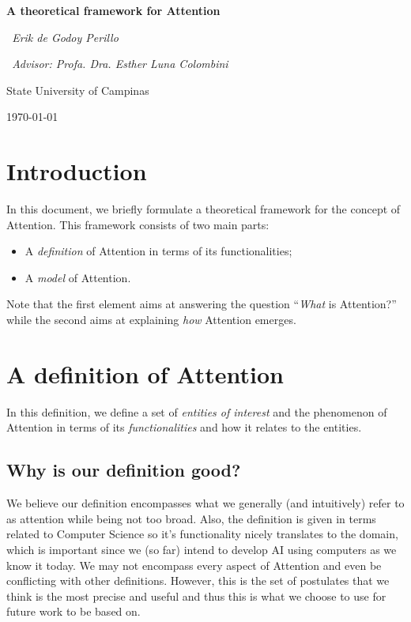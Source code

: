 \documentclass[11pt]{article}
\begin{document}

\begin{titlepage}
	\centering
	{\scshape\Large \par}
	\vspace{3.5cm}
	{\huge\bfseries A theoretical framework for Attention\par}
	\vspace{1cm}
	{\itshape~Erik de Godoy Perillo\par}%
    {\itshape~Advisor: Profa. Dra. Esther Luna Colombini\par}%
	\vspace{0.5cm}
	\vfill
	State University of Campinas
	\vfill
	{\large \today\par}
\end{titlepage}

\newpage




\section{Introduction}
In this document, we briefly formulate a theoretical framework for the concept of Attention.
This framework consists of two main parts:
\begin{itemize}
    \item A \emph{definition} of Attention in terms of its functionalities;
    \item A \emph{model} of Attention.
\end{itemize}
Note that the first element aims at answering the question ``\emph{What} is Attention?''
while the second aims at explaining \emph{how} Attention emerges.

\section{A definition of Attention}
\label{sec:definition}
In this definition, we define a set of \emph{entities of interest} and the phenomenon of Attention in terms of
its \emph{functionalities} and how it relates to the entities.

\subsection{Why is our definition good?}
We believe our definition encompasses what we generally (and intuitively) refer to as attention while being not too broad.
Also, the definition is given in terms related to Computer Science so it’s functionality nicely translates to the domain,
which is important since we (so far) intend to develop AI using computers as we know it today.
We may not encompass every aspect of Attention and even be conflicting with other definitions.
However, this is the set of postulates that we think is the most precise and useful and thus this is
what we choose to use for future work to be based on.
\end{document}

